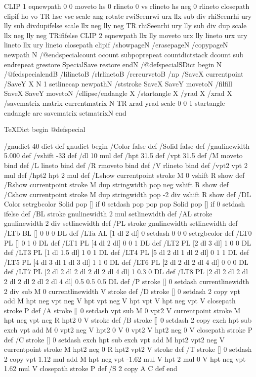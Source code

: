 {CLIP 1 eq{newpath 0 0 moveto hs 0 rlineto 0 vs rlineto hs neg 0 rlineto
closepath clip}if ho vo TR hsc vsc scale ang rotate rwiSeen{rwi urx llx
sub div rhiSeen{rhi ury lly sub div}{dup}ifelse scale llx neg lly neg TR
}{rhiSeen{rhi ury lly sub div dup scale llx neg lly neg TR}if}ifelse
CLIP 2 eq{newpath llx lly moveto urx lly lineto urx ury lineto llx ury
lineto closepath clip}if /showpage{}N /erasepage{}N /copypage{}N newpath
}N /@endspecial{count ocount sub{pop}repeat countdictstack dcount sub{
end}repeat grestore SpecialSave restore end}N /@defspecial{SDict begin}
N /@fedspecial{end}B /li{lineto}B /rl{rlineto}B /rc{rcurveto}B /np{
/SaveX currentpoint /SaveY X N 1 setlinecap newpath}N /st{stroke SaveX
SaveY moveto}N /fil{fill SaveX SaveY moveto}N /ellipse{/endangle X
/startangle X /yrad X /xrad X /savematrix matrix currentmatrix N TR xrad
yrad scale 0 0 1 startangle endangle arc savematrix setmatrix}N end

TeXDict begin @defspecial

 /gnudict 40 dict def gnudict begin /Color false def /Solid false def
/gnulinewidth 5.000 def /vshift -33 def /dl {10 mul} def /hpt 31.5
def /vpt 31.5 def /M {moveto} bind def /L {lineto} bind def /R {rmoveto}
bind def /V {rlineto} bind def /vpt2 vpt 2 mul def /hpt2 hpt 2 mul
def /Lshow { currentpoint stroke M 0 vshift R show } def /Rshow { currentpoint
stroke M dup stringwidth pop neg vshift R show } def /Cshow { currentpoint
stroke M dup stringwidth pop -2 div vshift R show } def /DL { Color
{setrgbcolor Solid {pop []} if 0 setdash } {pop pop pop Solid {pop
[]} if 0 setdash} ifelse } def /BL { stroke gnulinewidth 2 mul setlinewidth
} def /AL { stroke gnulinewidth 2 div setlinewidth } def /PL { stroke
gnulinewidth setlinewidth } def /LTb { BL [] 0 0 0 DL } def /LTa {
AL [1 dl 2 dl] 0 setdash 0 0 0 setrgbcolor } def /LT0 { PL [] 0 1 0
DL } def /LT1 { PL [4 dl 2 dl] 0 0 1 DL } def /LT2 { PL [2 dl 3 dl]
1 0 0 DL } def /LT3 { PL [1 dl 1.5 dl] 1 0 1 DL } def /LT4 { PL [5
dl 2 dl 1 dl 2 dl] 0 1 1 DL } def /LT5 { PL [4 dl 3 dl 1 dl 3 dl] 1
1 0 DL } def /LT6 { PL [2 dl 2 dl 2 dl 4 dl] 0 0 0 DL } def /LT7 {
PL [2 dl 2 dl 2 dl 2 dl 2 dl 4 dl] 1 0.3 0 DL } def /LT8 { PL [2 dl
2 dl 2 dl 2 dl 2 dl 2 dl 2 dl 4 dl] 0.5 0.5 0.5 DL } def /P { stroke
[] 0 setdash currentlinewidth 2 div sub M 0 currentlinewidth V stroke
} def /D { stroke [] 0 setdash 2 copy vpt add M hpt neg vpt neg V hpt
vpt neg V hpt vpt V hpt neg vpt V closepath stroke P } def /A { stroke
[] 0 setdash vpt sub M 0 vpt2 V currentpoint stroke M hpt neg vpt neg
R hpt2 0 V stroke } def /B { stroke [] 0 setdash 2 copy exch hpt sub
exch vpt add M 0 vpt2 neg V hpt2 0 V 0 vpt2 V hpt2 neg 0 V closepath
stroke P } def /C { stroke [] 0 setdash exch hpt sub exch vpt add M
hpt2 vpt2 neg V currentpoint stroke M hpt2 neg 0 R hpt2 vpt2 V stroke
} def /T { stroke [] 0 setdash 2 copy vpt 1.12 mul add M hpt neg vpt
-1.62 mul V hpt 2 mul 0 V hpt neg vpt 1.62 mul V closepath stroke P
} def /S { 2 copy A C} def end

